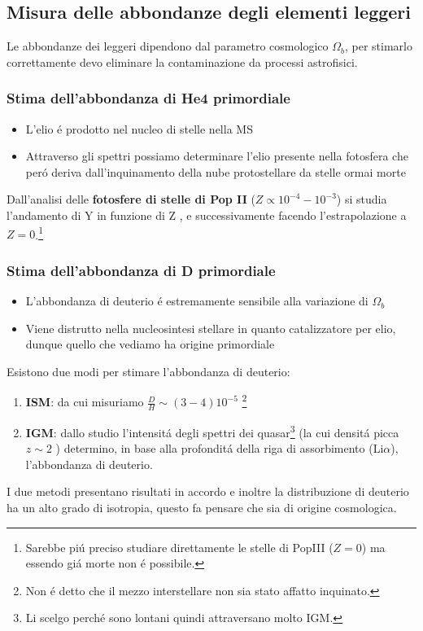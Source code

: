\documentclass[12pt, a4paper]{article}
\begin{document}
\subsection{Misura delle abbondanze degli elementi leggeri}
Le abbondanze dei leggeri dipendono dal parametro cosmologico $\Omega_b$, per stimarlo correttamente devo eliminare la contaminazione da processi astrofisici.
\subsubsection{Stima dell'abbondanza di He4 primordiale}
\begin{itemize}
\item L'elio  \'{e} prodotto nel nucleo di stelle nella MS
\item Attraverso gli spettri possiamo determinare l'elio presente nella fotosfera che per\'{o} deriva dall'inquinamento della nube protostellare da stelle ormai morte
\end{itemize}

Dall'analisi delle \textbf{fotosfere di stelle di Pop II} ($Z\propto 10^{-4}-10^{-3}$) si studia l'andamento di Y in funzione di Z , e successivamente facendo l'estrapolazione a $Z=0$.\footnote{Sarebbe pi\'{u} preciso studiare direttamente le stelle di PopIII ($Z=0$) ma essendo gi\'{a} morte non \'{e} possibile.}
\subsubsection{Stima dell'abbondanza di D primordiale}
\begin{itemize}
\item L'abbondanza di deuterio \'{e} estremamente sensibile alla variazione di $\Omega_b$
\item Viene distrutto nella nucleosintesi stellare in quanto catalizzatore per elio, dunque quello che vediamo ha origine primordiale
\end{itemize}
Esistono due modi per stimare l'abbondanza di deuterio:
\begin{enumerate}
\item \textbf{ISM}: da cui misuriamo $\frac{D}{H}\sim (3-4)10^{-5}$ \footnote{Non \'{e} detto che il mezzo interstellare non sia stato affatto inquinato.}
\item \textbf{IGM}: dallo studio l'intensit\'{a} degli spettri dei quasar\footnote{Li scelgo perch\'{e} sono lontani quindi attraversano molto IGM.} (la cui densit\'{a} picca $z\sim 2$ ) determino,  in base alla profondit\'{a} della riga di assorbimento (Li$\alpha$), l'abbondanza di deuterio.
\end{enumerate}
I due metodi presentano risultati in accordo e inoltre la distribuzione di deuterio ha un alto grado di isotropia, questo fa pensare che sia di origine cosmologica.
\end{document}
